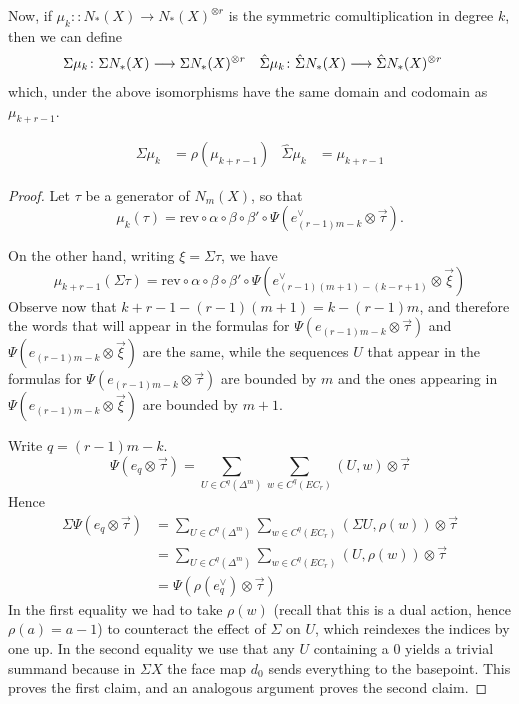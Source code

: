 Now, if $\mu_{k}\colon \colon N_*(X)\to N_*(X)^{\otimes r}$ is the symmetric comultiplication in degree $k$, then we can define
\begin{align*}
    \Sigma \mu_k\colon \Sigma N_*(X)&\longrightarrow \Sigma N_*(X)^{\otimes r}
    &
    \hat{\Sigma} \mu_k\colon \hat{\Sigma} N_*(X)&\longrightarrow \hat{\Sigma} N_*(X)^{\otimes r}
\end{align*}
which, under the above isomorphisms have the same domain and codomain as $\mu_{k+r-1}$.
\begin{proposition}
    \begin{align*}
        \Sigma \mu_k &= \rho(\mu_{k+r-1}) &
        \hat{\Sigma} \mu_k &= \mu_{k+r-1}
    \end{align*}
\end{proposition}

\begin{proof}
    Let $\tau$ be a generator of $N_m(X)$, so that \[\mu_k(\tau) = \mathrm{rev}\circ \alpha\circ\beta\circ\beta'\circ \Psi(e_{(r-1)m-k}^\vee\otimes \vec{\tau}).\]

    On the other hand, writing $\xi = \Sigma \tau$, we have
    \[\mu_{k+r-1}(\Sigma \tau) = \mathrm{rev}\circ \alpha\circ\beta\circ\beta'\circ \Psi(e_{(r-1)(m+1)-(k-r+1)}^\vee\otimes \vec{\xi})\]
     Observe now that $k+r-1-(r-1)(m+1) = k-(r-1)m$, and therefore the words that will appear in the formulas for $\Psi(e_{(r-1)m-k}\otimes \vec{\tau})$ and $\Psi(e_{(r-1)m-k}\otimes \vec{\xi})$ are the same, while the sequences $U$ that appear in the formulas for $\Psi(e_{(r-1)m-k}\otimes \vec{\tau})$ are bounded by $m$ and the ones appearing in $\Psi(e_{(r-1)m-k}\otimes \vec{\xi})$ are bounded by $m+1$.

     Write $q = (r-1)m-k$.
     \[\Psi(e_{q}\otimes \vec{\tau}) = \sum_{U\in C^{q}(\Delta^m)}\sum_{w\in C^q(EC_r)} (U,w)\otimes \vec{\tau} \]
     Hence
     \begin{align*}
         \Sigma\Psi(e_{q}\otimes \vec{\tau})
         &= \sum_{U\in C^{q}(\Delta^m)}\sum_{w\in C^q(EC_r)} (\Sigma U,\rho(w))\otimes \vec{\tau} \\
         &= \sum_{U\in C^{q}(\Delta^m)}\sum_{w\in C^q(EC_r)} (U,\rho(w))\otimes \vec{\tau} \\
         &= \Psi(\rho(e_q^\vee)\otimes \vec{\tau})
    \end{align*}
    In the first equality we had to take $\rho(w)$ (recall that this is a dual action, hence $\rho(a) = a-1$) to counteract the effect of $\Sigma$ on $U$, which reindexes the indices by one up. In the second equality we use that any $U$ containing a $0$ yields a trivial summand because in $\Sigma X$ the face map $d_0$ sends everything to the basepoint. This proves the first claim, and an analogous argument proves the second claim.
\end{proof}

